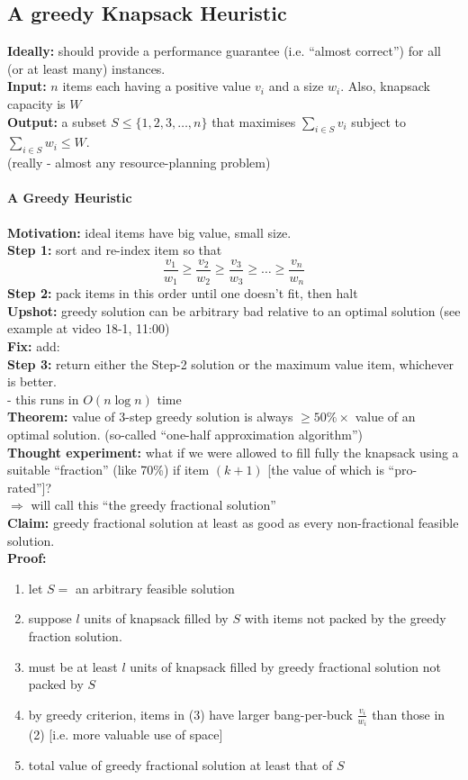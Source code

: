 \documentclass{scrartcl}
\begin{document}
\subsection{A greedy Knapsack Heuristic}
\label{sec:18-1}
{\bf Ideally: } should provide a performance guarantee (i.e. ``almost correct'') for all (or at least many) instances.\\
{\bf Input: } $n$ items each having a positive value $v_i$ and a size $w_i$.
Also, knapsack capacity is $W$\\
{\bf Output: } a subset $S \leq \{1, 2, 3, \dots, n \}$ that maximises $\sum
\limits_{i \in S} v_i$ subject to $\sum \limits_{i \in S} w_i \leq W$.\\
(really - almost any resource-planning problem)\\

\paragraph{A Greedy Heuristic}


{\bf Motivation: } ideal items have big value, small size. \\
{\bf Step 1: } sort and re-index item so that 
$$\frac{v_1}{w_1} \geq \frac{v_2}{w_2} \geq \frac{v_3}{w_3} \geq \dots \geq
\frac{v_n}{w_n}$$ 
{\bf Step 2:} pack items in this order until one doesn't fit, then halt\\
{\bf Upshot: } greedy solution can be arbitrary bad relative to an optimal solution (see example at video 18-1, 11:00)\\
{\bf Fix: } add:\\
{\bf Step 3: } return either the Step-2 solution or the maximum value item, whichever is better.\\
- this runs in $O(n \log n)$ time\\
{\bf Theorem: } value of 3-step greedy solution is always $\geq 50\% \times$ value of an optimal solution. (so-called ``one-half approximation algorithm'')\\
{\bf Thought experiment: } what if we were allowed to fill fully the knapsack using a suitable ``fraction'' (like 70\%) if item $(k+1)$ [the value of which is ``pro-rated'']? \\
$\Rightarrow$ will call this ``the greedy fractional solution''\\
{\bf Claim: } greedy fractional solution at least as good as every
non-fractional feasible solution.\\
{\bf Proof: } 
\begin{enumerate}
\item let $S=$ an arbitrary feasible solution
\item suppose $l$ units of knapsack filled by $S$ with items not packed by the
  greedy fraction solution.
\item must be at least $l$ units of knapsack filled by greedy fractional
  solution not packed by $S$
\item by greedy criterion, items in (3) have larger bang-per-buck $\frac{v_i}{w_i}$ than those in (2) [i.e. more valuable use of space]
\item total value of greedy fractional solution at least that of $S$
\end{enumerate}
\end{document}
